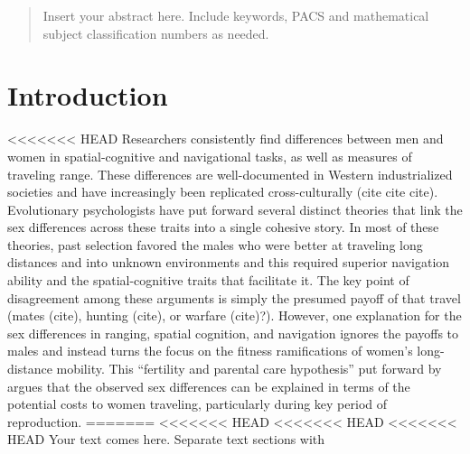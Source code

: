 \date{Received: date / Accepted: date}


\maketitle

\begin{abstract}
Insert your abstract here. Include keywords, PACS and mathematical
subject classification numbers as needed.
\end{abstract}

\section{Introduction}
\label{sec:1}
<<<<<<< HEAD
Researchers consistently find differences between men and women in spatial-cognitive and navigational tasks, as well as measures of traveling range.  These differences are well-documented in Western industrialized societies and have increasingly been replicated cross-culturally (cite cite cite).  Evolutionary psychologists have put forward several distinct theories that link the sex differences across these traits into a single cohesive story.  In most of these theories, past selection favored the males who were better at traveling long distances and into unknown environments and this required superior navigation ability and the spatial-cognitive traits that facilitate it.  The key point of disagreement among these arguments is simply the presumed payoff of that travel (mates (cite), hunting (cite), or warfare (cite)?).  However, one explanation for the sex differences in ranging, spatial cognition, and navigation ignores the payoffs to males and instead turns the focus on the fitness ramifications of women's long-distance mobility.  This ``fertility and parental care hypothesis'' put forward by \cite{sherry1997evolution} argues that the observed sex differences can be explained in terms of the potential costs to women traveling, particularly during key period of reproduction.
=======
<<<<<<< HEAD
<<<<<<< HEAD
<<<<<<< HEAD
Your text comes here. Separate text sections with


